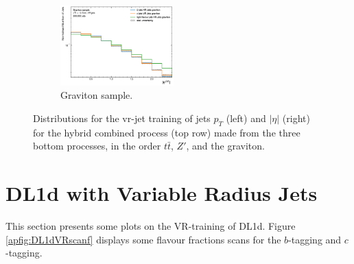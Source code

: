 \begin{figure}[h!]
\begin{subfigure}[b]{0.98\textwidth}
      \includegraphics[width=0.48\textwidth]{Images/FTAG/VRDips/JetDist/greta.png}
      \caption{Graviton sample.} 
      \label{apfig:vrjetdisgr}
  \end{subfigure}
  \caption{Distributions for the \gls{vr}-jet training of jets $p_T$ (left) and $|\eta|$ (right) for the hybrid combined process (top row) made from the three bottom processes, in the order $t\bar{t}$, $Z'$, and the graviton.}
  \label{apfig:vrjetdist}
\end{figure} 

\section{DL1d with Variable Radius Jets}\label{ap-DL1dVR}
This section presents some plots on the VR-training of DL1d. Figure \ref{apfig:DL1dVRscanf} displays some flavour fractions scans for the $b$-tagging and $c$-tagging. 

